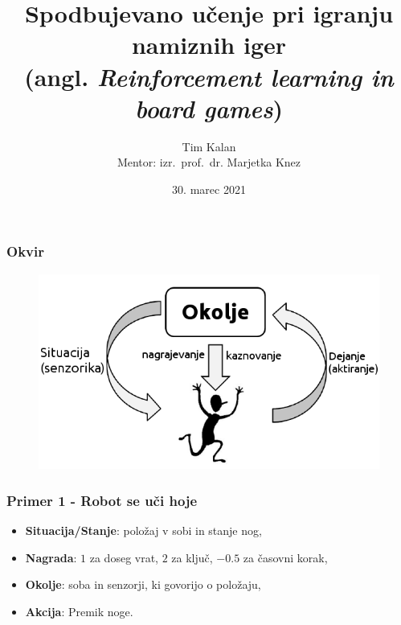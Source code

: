 \documentclass{beamer}    %
\author{Tim Kalan \\ \medskip
        \footnotesize Mentor: izr.~prof.~dr. Marjetka Knez}
\institute[FMF]{Fakulteta za matematiko in fiziko}
\title{
    Spodbujevano učenje pri igranju namiznih iger \\ 
    \large (angl. \textit{Reinforcement learning in board games})}
\date{30. marec 2021}
\begin{document}
\begin{frame}
    \titlepage
\end{frame}


\begin{frame}
    \frametitle{Okvir}
    \begin{figure}
        \includegraphics[scale=0.5]{slike/RLloop.png}
    \end{figure}
\end{frame}


\begin{frame}
    \frametitle{Primer 1 - Robot se uči hoje}
    \begin{itemize}
        \item \textbf{Situacija/Stanje}: položaj v sobi in stanje nog,
        \item \textbf{Nagrada}: $1$ za doseg vrat, $2$ za ključ, $-0.5$ za časovni korak,
        \item \textbf{Okolje}: soba in senzorji, ki govorijo o položaju,
        \item \textbf{Akcija}: Premik noge.
    \end{itemize}
\end{frame}
\end{document}
